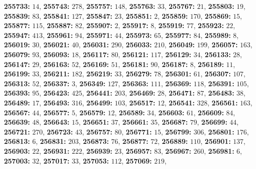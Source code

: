 \textsf{\bfseries 255733:} $14$, \textsf{\bfseries 255743:} $278$, \textsf{\bfseries 255757:} $148$, \textsf{\bfseries 255763:} $33$, \textsf{\bfseries 255767:} $21$, \textsf{\bfseries 255803:} $19$, \textsf{\bfseries 255839:} $83$, \textsf{\bfseries 255841:} $127$, \textsf{\bfseries 255847:} $23$, \textsf{\bfseries 255851:} $2$, \textsf{\bfseries 255859:} $170$, \textsf{\bfseries 255869:} $15$, \textsf{\bfseries 255877:} $115$, \textsf{\bfseries 255887:} $82$, \textsf{\bfseries 255907:} $2$, \textsf{\bfseries 255917:} $8$, \textsf{\bfseries 255919:} $77$, \textsf{\bfseries 255923:} $22$, \textsf{\bfseries 255947:} $413$, \textsf{\bfseries 255961:} $94$, \textsf{\bfseries 255971:} $44$, \textsf{\bfseries 255973:} $65$, \textsf{\bfseries 255977:} $84$, \textsf{\bfseries 255989:} $8$, \textsf{\bfseries 256019:} $30$, \textsf{\bfseries 256021:} $40$, \textsf{\bfseries 256031:} $290$, \textsf{\bfseries 256033:} $210$, \textsf{\bfseries 256049:} $199$, \textsf{\bfseries 256057:} $163$, \textsf{\bfseries 256079:} $93$, \textsf{\bfseries 256093:} $18$, \textsf{\bfseries 256117:} $80$, \textsf{\bfseries 256121:} $117$, \textsf{\bfseries 256129:} $34$, \textsf{\bfseries 256133:} $28$, \textsf{\bfseries 256147:} $29$, \textsf{\bfseries 256163:} $52$, \textsf{\bfseries 256169:} $51$, \textsf{\bfseries 256181:} $90$, \textsf{\bfseries 256187:} $8$, \textsf{\bfseries 256189:} $11$, \textsf{\bfseries 256199:} $33$, \textsf{\bfseries 256211:} $182$, \textsf{\bfseries 256219:} $33$, \textsf{\bfseries 256279:} $78$, \textsf{\bfseries 256301:} $61$, \textsf{\bfseries 256307:} $107$, \textsf{\bfseries 256313:} $52$, \textsf{\bfseries 256337:} $3$, \textsf{\bfseries 256349:} $127$, \textsf{\bfseries 256363:} $111$, \textsf{\bfseries 256369:} $118$, \textsf{\bfseries 256391:} $105$, \textsf{\bfseries 256393:} $95$, \textsf{\bfseries 256423:} $425$, \textsf{\bfseries 256441:} $203$, \textsf{\bfseries 256469:} $28$, \textsf{\bfseries 256471:} $87$, \textsf{\bfseries 256483:} $38$, \textsf{\bfseries 256489:} $17$, \textsf{\bfseries 256493:} $316$, \textsf{\bfseries 256499:} $103$, \textsf{\bfseries 256517:} $12$, \textsf{\bfseries 256541:} $328$, \textsf{\bfseries 256561:} $163$, \textsf{\bfseries 256567:} $44$, \textsf{\bfseries 256577:} $5$, \textsf{\bfseries 256579:} $12$, \textsf{\bfseries 256589:} $34$, \textsf{\bfseries 256603:} $61$, \textsf{\bfseries 256609:} $84$, \textsf{\bfseries 256639:} $48$, \textsf{\bfseries 256643:} $15$, \textsf{\bfseries 256651:} $37$, \textsf{\bfseries 256661:} $35$, \textsf{\bfseries 256687:} $79$, \textsf{\bfseries 256699:} $44$, \textsf{\bfseries 256721:} $270$, \textsf{\bfseries 256723:} $43$, \textsf{\bfseries 256757:} $80$, \textsf{\bfseries 256771:} $15$, \textsf{\bfseries 256799:} $306$, \textsf{\bfseries 256801:} $176$, \textsf{\bfseries 256813:} $6$, \textsf{\bfseries 256831:} $203$, \textsf{\bfseries 256873:} $76$, \textsf{\bfseries 256877:} $72$, \textsf{\bfseries 256889:} $110$, \textsf{\bfseries 256901:} $137$, \textsf{\bfseries 256903:} $22$, \textsf{\bfseries 256931:} $222$, \textsf{\bfseries 256939:} $23$, \textsf{\bfseries 256957:} $83$, \textsf{\bfseries 256967:} $260$, \textsf{\bfseries 256981:} $6$, \textsf{\bfseries 257003:} $32$, \textsf{\bfseries 257017:} $33$, \textsf{\bfseries 257053:} $112$, \textsf{\bfseries 257069:} $219$, 
